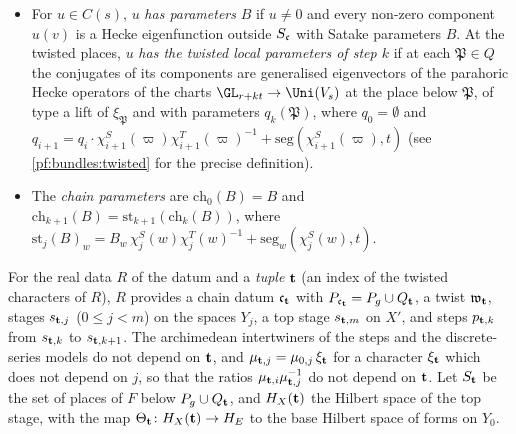 \begin{itemize}
characters of the step, a step vector, polynomial test functions $\Phi_\phi$ attached to polynomials $\phi$, archimedean intertwiners
$I_\phi$ from the vectors of $s'$ to those of $s$, and the \emph{downward lift} $\iota_p\colon C(s')\to C(s)$, characterised by
\[
\int_{\mathcal F_{s'}}\theta(g,h;\Phi_\phi)\,y(v)(h)\,d\nu_{s'}(h)=\iota_p(y)(I_\phi v)(g).
\]
The \emph{upward lift} of a function $F$ on $\Uni(V_s)(\A_F)$ is $\theta_\phi(F)(h)=\int_{\mathcal F_s}\overline{\theta(g,h;\Phi_\phi)}F(g)\,
d\nu_s(g)$.
\item For $u\in C(s)$, $u$ \emph{has parameters} $B$ if $u\ne0$ and every non-zero component $u(v)$ is a Hecke eigenfunction outside
$S_\mathfrak c$ with Satake parameters $B$. At the twisted places, $u$ \emph{has the twisted local parameters of step $k$} if at each
$\mathfrak P\in Q$ the conjugates of its components are generalised eigenvectors of the parahoric Hecke operators of the charts
$\GL_{r+kt}\to\Uni(V_s)$ at the place below $\mathfrak P$, of type a lift of $\xi_{\mathfrak P}$ and with parameters $q_k(\mathfrak P)$, where
$q_0=\emptyset$ and $q_{i+1}=q_i\cdot\chi^S_{i+1}(\varpi)\chi^T_{i+1}(\varpi)^{-1}+\mathrm{seg}(\chi^S_{i+1}(\varpi),t)$ (see
\cref{pf:bundles:twisted} for the precise definition).
\item The \emph{chain parameters} are $\mathrm{ch}_0(B)=B$ and $\mathrm{ch}_{k+1}(B)=\mathrm{st}_{k+1}(\mathrm{ch}_k(B))$, where
$\mathrm{st}_{j}(B)_w=B_w\,\chi^S_{j}(w)\chi^T_{j}(w)^{-1}+\mathrm{seg}_w(\chi^S_{j}(w),t)$.
\end{itemize}

For the real data $R$ of the datum and a \emph{tuple} $\mathbf t$ (an index of the twisted characters of $R$), $R$ provides a chain datum
$\mathfrak c_\mathbf t$ with $P_{\mathfrak c_\mathbf t}=P_g\cup Q_\mathbf t$, a twist $\mathfrak w_\mathbf t$, stages $s_{\mathbf t,j}$ ($0\le j<m$) on the spaces $Y_j$,
a top stage $s_{\mathbf t,m}$ on $X'$, and steps $p_{\mathbf t,k}$ from $s_{\mathbf t,k}$ to $s_{\mathbf t,k+1}$. The archimedean intertwiners of the
steps and the discrete-series models do not depend on $\mathbf t$, and $\mu_{\mathbf t,j}=\mu_{0,j}\,\xi_\mathbf t$ for a character $\xi_\mathbf t$ which does
not depend on $j$, so that the ratios $\mu_{\mathbf t,i}\mu_{\mathbf t,j}^{-1}$ do not depend on $\mathbf t$. Let $S_\mathbf t$ be the set of places of $F$ below $P_g\cup Q_\mathbf t$, and $H_X(\mathbf t)$
the Hilbert space of the top stage, with the map $\Theta_\mathbf t\colon H_X(\mathbf t)\to H_E$ to the base Hilbert space of forms on $Y_0$.

